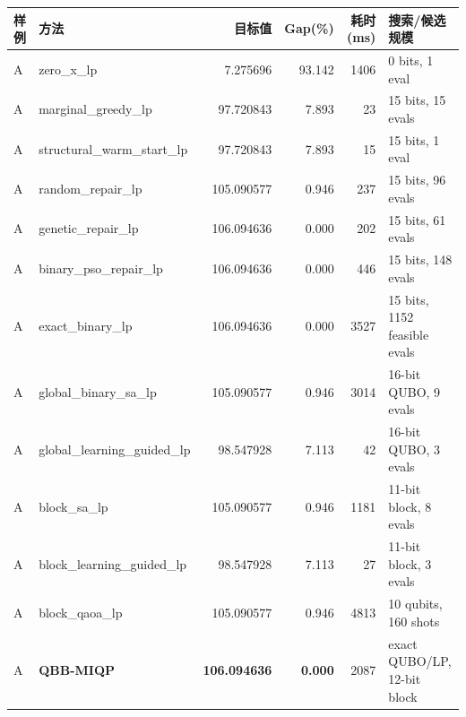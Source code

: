 \documentclass[UTF8,a4paper,11pt]{ctexart}
\begin{document}
{\scriptsize
\begin{center}
\begin{tabular}{llrrrl}
\toprule
样例 & 方法 & 目标值 & Gap(\%) & 耗时(ms) & 搜索/候选规模 \\
\midrule
A & zero\_x\_lp & 7.275696 & 93.142 & 1406 & 0 bits, 1 eval \\
A & marginal\_greedy\_lp & 97.720843 & 7.893 & 23 & 15 bits, 15 evals \\
A & structural\_warm\_start\_lp & 97.720843 & 7.893 & 15 & 15 bits, 1 eval \\
A & random\_repair\_lp & 105.090577 & 0.946 & 237 & 15 bits, 96 evals \\
A & genetic\_repair\_lp & 106.094636 & 0.000 & 202 & 15 bits, 61 evals \\
A & binary\_pso\_repair\_lp & 106.094636 & 0.000 & 446 & 15 bits, 148 evals \\
A & exact\_binary\_lp & 106.094636 & 0.000 & 3527 & 15 bits, 1152 feasible evals \\
A & global\_binary\_sa\_lp & 105.090577 & 0.946 & 3014 & 16-bit QUBO, 9 evals \\
A & global\_learning\_guided\_lp & 98.547928 & 7.113 & 42 & 16-bit QUBO, 3 evals \\
A & block\_sa\_lp & 105.090577 & 0.946 & 1181 & 11-bit block, 8 evals \\
A & block\_learning\_guided\_lp & 98.547928 & 7.113 & 27 & 11-bit block, 3 evals \\
A & block\_qaoa\_lp & 105.090577 & 0.946 & 4813 & 10 qubits, 160 shots \\
A & \textbf{QBB-MIQP} & \textbf{106.094636} & \textbf{0.000} & 2087 & exact QUBO/LP, 12-bit block \\
\bottomrule
\end{tabular}
\end{center}

}
\end{document}
